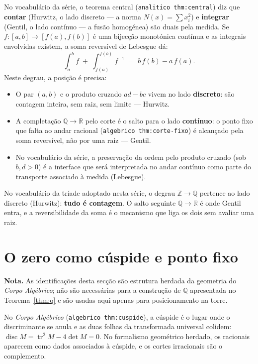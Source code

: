 \documentclass[11pt,a4paper]{article}
\newcommand{\code}[1]{\texttt{\small #1}}
\begin{document}
No vocabulário da série, o teorema central (\code{analitico thm:central}) diz
que \textbf{contar} (Hurwitz, o lado discreto --- a norma
$N(x)=\sum x_i^{2}$) e \textbf{integrar} (Gentil, o lado contínuo --- a fusão
homogénea) são duais
pela medida. Se $f:[a,b]\to[f(a),f(b)]$ é uma bijecção monotónica contínua e
as integrais envolvidas existem, a soma reversível de Lebesgue dá:
\[
\int_a^b f \;+\; \int_{f(a)}^{f(b)} f^{-1} \;=\; b\,f(b)-a\,f(a).
\]
Neste degrau, a posição é precisa:
\begin{itemize}
\item O par $(a,b)$ e o produto cruzado $ad-bc$ vivem no lado
  \textbf{discreto}: são contagem inteira, sem raiz, sem limite --- Hurwitz.
\item A completação $\mathbb{Q}\to\mathbb{R}$ pelo corte é o salto para o
  lado \textbf{contínuo}: o ponto fixo que falta ao andar racional
  (\code{algebrico thm:corte-fixo}) é alcançado pela soma reversível, não por
  uma raiz --- Gentil.
\item No vocabulário da série, a preservação da ordem pelo produto cruzado
  (sob $b,d>0$) é a interface que será interpretada no andar contínuo como
  parte do transporte associado à medida (Lebesgue).
\end{itemize}
No vocabulário da tríade adoptado nesta série, o degrau
$\mathbb{Z}\to\mathbb{Q}$ pertence ao lado discreto (Hurwitz): \textbf{tudo é
contagem}. O salto seguinte $\mathbb{Q}\to\mathbb{R}$ é onde Gentil entra, e
a reversibilidade da soma é o mecanismo que liga os dois sem avaliar uma raiz.

\section{O zero como cúspide e ponto fixo}\label{sec:cuspide}

\noindent\textbf{Nota.} As identificações desta secção são estrutura herdada
da geometria do \emph{Corpo Algébrico}; não são necessárias para a construção
de $\mathbb{Q}$ apresentada no Teorema~\ref{thm:q} e são usadas aqui apenas
para posicionamento na torre.

\medskip\noindent
No \emph{Corpo Algébrico} (\code{algebrico thm:cuspide}), a cúspide é o lugar
onde o discriminante se anula e as duas folhas da transformada universal
colidem: $\operatorname{disc}M=\operatorname{tr}^{2}M-4\det M=0$.
No formalismo geométrico herdado, os racionais aparecem como dados associados
à cúspide, e os cortes irracionais são o complemento.
\end{document}
